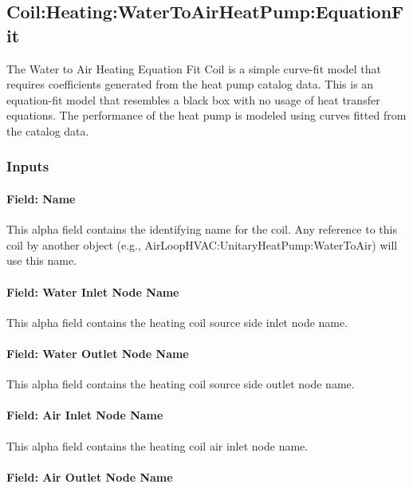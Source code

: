 \subsection{Coil:Heating:WaterToAirHeatPump:EquationFit}\label{coilheatingwatertoairheatpumpequationfit}

The Water to Air Heating Equation Fit Coil is a simple curve-fit model that requires coefficients generated from the heat pump catalog data. This is an equation-fit model that resembles a black box with no usage of heat transfer equations. The performance of the heat pump is modeled using curves fitted from the catalog data.

\subsubsection{Inputs}\label{inputs-33}

\paragraph{Field: Name}\label{field-name-32}

This alpha field contains the identifying name for the coil. Any reference to this coil by another object (e.g., AirLoopHVAC:UnitaryHeatPump:WaterToAir) will use this name.

\paragraph{Field: Water Inlet Node Name}\label{field-water-inlet-node-name-9}

This alpha field contains the heating coil source side inlet node name.

\paragraph{Field: Water Outlet Node Name}\label{field-water-outlet-node-name-9}

This alpha field contains the heating coil source side outlet node name.

\paragraph{Field: Air Inlet Node Name}\label{field-air-inlet-node-name-20}

This alpha field contains the heating coil air inlet node name.

\paragraph{Field: Air Outlet Node Name}\label{field-air-outlet-node-name-20}

